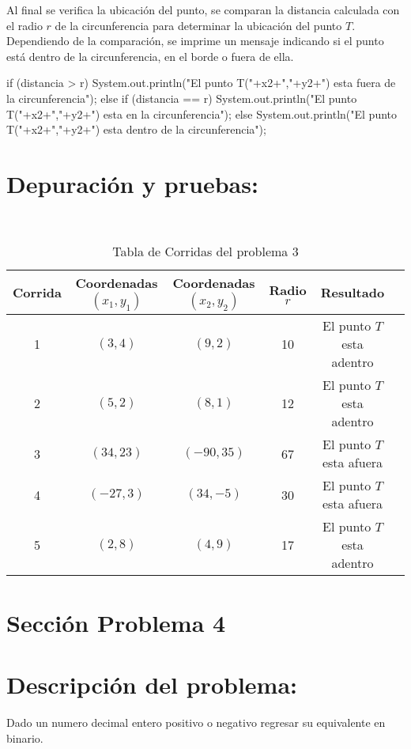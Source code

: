 \documentclass{IEEEcsmag}
\begin{document}
Al final se verifica la ubicación del punto, se comparan la distancia calculada con el radio $r$ de la circunferencia para determinar la ubicación del punto $T$. 
Dependiendo de la comparación, se imprime un mensaje indicando si el punto está dentro de la circunferencia, en el borde o fuera de ella.
\begin{javacode}
if (distancia > r) {
     System.out.println("El punto T("+x2+","+y2+") esta fuera de la circunferencia");
     }else if (distancia == r) {
     System.out.println("El punto T("+x2+","+y2+") esta en la circunferencia");
    }else{
     System.out.println("El punto T("+x2+","+y2+") esta dentro de la circunferencia");
    }
\end{javacode}


\section*{Depuración y pruebas:}
\begin{table}[h!]
     \centering
     \caption{Tabla de Corridas del problema 3}\\

     \begin{tabular}{|c|c|c|c|c|c|}
     \hline
    Corrida & Coordenadas $(x_{1}, y_{1})$& Coordenadas $(x_{2}, y_{2})$  &  Radio $r$ & Resultado\\
    \hline
    1  &  $(3,4)$ & $(9,2)$ & 10 & El punto $T$ esta adentro \\
    \hline
    2  &  $(5,2)$ & $(8,1)$ & 12 & El punto $T$ esta adentro \\
    \hline
    3  &  $(34,23)$ & $(-90,35)$ & 67 & El punto $T$ esta afuera \\
    \hline
    4  &  $(-27,3)$ & $(34,-5)$ & 30 & El punto $T$ esta afuera \\
    \hline
    5 &  $(2,8)$ & $(4,9)$ & 17 & El punto $T$ esta adentro \\
    \hline
     \end{tabular}
     \label{tab:my_label}
 \end{table}





\section{Sección Problema 4}
\section*{Descripción del problema:}
Dado un numero decimal entero positivo o negativo regresar su equivalente en binario.
\newline
\end{document}
